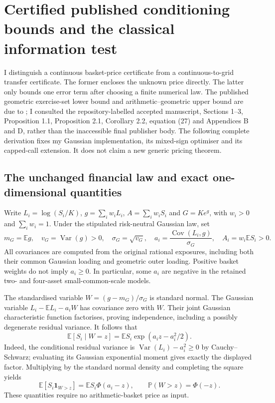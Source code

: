\section{Certified published conditioning bounds and the classical information test}
\label{supp:classical-price-bounds}

I distinguish a continuous basket-price certificate from a continuous-to-grid
transfer certificate. The former encloses the unknown price directly. The
latter only bounds one error term after choosing a finite numerical law.
The published geometric exercise-set lower bound and arithmetic--geometric
upper bound are due to \citet{caldana}; I consulted the repository-labelled
accepted manuscript, Sections 1--3, Proposition 1.1, Proposition 2.1,
Corollary 2.2, equation (27) and Appendices B and D, rather than the
inaccessible final publisher body. The following complete derivation fixes
my Gaussian implementation, its mixed-sign optimiser and its capped-call
extension. It does not claim a new generic pricing theorem.

\subsection{The unchanged financial law and exact one-dimensional quantities}

Write $L_i=\log(S_i/K)$, $g=\sum_iw_iL_i$, $A=\sum_iw_iS_i$ and
$G=K e^g$, with $w_i>0$ and $\sum_iw_i=1$. Under the stipulated
risk-neutral Gaussian law, set
\[
 m_G=\mathbb E g,\quad v_G=\operatorname{Var}(g)>0,\quad
 \sigma_G=\sqrt{v_G},\quad
 a_i=\frac{\operatorname{Cov}(L_i,g)}{\sigma_G},\quad
 A_i=w_i\mathbb E S_i>0.
\]
All covariances are computed from the original rational exposures, including
both their common Gaussian loading and geometric outer loading. Positive
basket weights do not imply $a_i\geq0$. In particular, some $a_i$ are
negative in the retained two- and four-asset small-common-scale models.

The standardised variable $W=(g-m_G)/\sigma_G$ is standard normal.
The Gaussian variable $L_i-\mathbb E L_i-a_iW$ has covariance zero with
$W$. Their joint Gaussian characteristic function factorises, proving
independence, including a possibly degenerate residual variance.
It follows that
\[
 \mathbb E[S_i\mid W=z]
 =\mathbb E S_i\exp(a_i z-a_i^2/2).
\]
Indeed, the conditional residual variance is
$\operatorname{Var}(L_i)-a_i^2\geq0$ by Cauchy--Schwarz; evaluating its
Gaussian exponential moment gives exactly the displayed factor. Multiplying
by the standard normal density and completing the square yields
\[
 \mathbb E[S_i\mathbf1_{W>z}]=\mathbb E S_i\Phi(a_i-z),
 \qquad \mathbb P(W>z)=\Phi(-z).
\]
These quantities require no arithmetic-basket price as input.

